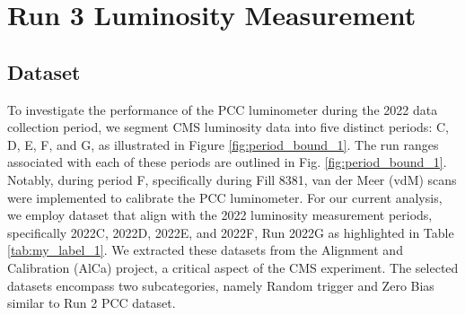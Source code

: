 \chapter{Run 3 Luminosity Measurement}  %

\ifpdf
    \graphicspath{{Chapter1/Figs/Raster/}{Chapter1/Figs/PDF/}{Chapter1/Figs/}}
\else
    \graphicspath{{Chapter1/Figs/Vector/}{Chapter1/Figs/}}
\fi








\section{Dataset}

To investigate the performance of the PCC luminometer during the 2022 data collection period, we segment CMS luminosity data into five distinct periods:  C, D, E, F, and G, as illustrated in Figure \ref{fig:period_bound_1}. The run ranges associated with each of these periods are outlined in Fig. \ref{fig:period_bound_1}. Notably, during period F, specifically during Fill 8381, van der Meer (vdM) scans were implemented to calibrate the PCC luminometer. For our current analysis, we employ dataset that align with the 2022 luminosity measurement periods, specifically 2022C, 2022D, 2022E, and 2022F, Run 2022G as highlighted in Table \ref{tab:my_label_1}. We extracted these datasets from the Alignment and Calibration (AlCa) project, a critical aspect of the CMS experiment. The selected datasets encompass two subcategories, namely Random trigger and Zero Bias similar to Run 2 PCC dataset. %

